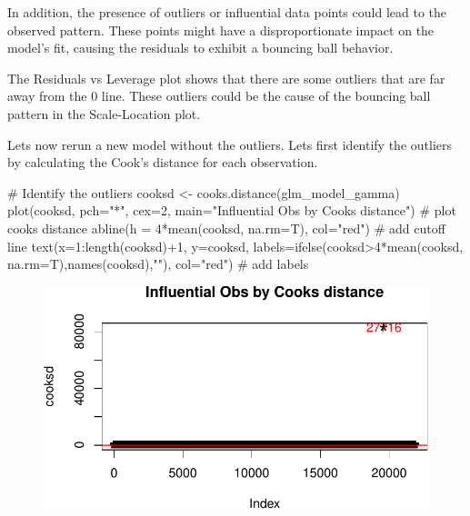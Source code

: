 \documentclass[
  super,
  preprint,
  3p]{elsarticle}
\newenvironment{Shaded}{\begin{snugshade}}{\end{snugshade}}
\newcommand{\AttributeTok}[1]{\textcolor[rgb]{0.40,0.45,0.13}{#1}}
\newcommand{\CommentTok}[1]{\textcolor[rgb]{0.37,0.37,0.37}{#1}}
\newcommand{\DecValTok}[1]{\textcolor[rgb]{0.68,0.00,0.00}{#1}}
\newcommand{\FunctionTok}[1]{\textcolor[rgb]{0.28,0.35,0.67}{#1}}
\newcommand{\NormalTok}[1]{\textcolor[rgb]{0.00,0.23,0.31}{#1}}
\newcommand{\OtherTok}[1]{\textcolor[rgb]{0.00,0.23,0.31}{#1}}
\newcommand{\SpecialCharTok}[1]{\textcolor[rgb]{0.37,0.37,0.37}{#1}}
\newcommand{\StringTok}[1]{\textcolor[rgb]{0.13,0.47,0.30}{#1}}
\begin{document}
In addition, the presence of outliers or influential data points could
lead to the observed pattern. These points might have a disproportionate
impact on the model's fit, causing the residuals to exhibit a bouncing
ball behavior.

The Residuals vs Leverage plot shows that there are some outliers that
are far away from the 0 line. These outliers could be the cause of the
bouncing ball pattern in the Scale-Location plot.

Lets now rerun a new model without the outliers. Lets first identify the
outliers by calculating the Cook's distance for each observation.

\begin{Shaded}
\begin{Highlighting}[]
\CommentTok{\# Identify the outliers}
\NormalTok{cooksd }\OtherTok{\textless{}{-}} \FunctionTok{cooks.distance}\NormalTok{(glm\_model\_gamma)}
\FunctionTok{plot}\NormalTok{(cooksd, }\AttributeTok{pch=}\StringTok{"*"}\NormalTok{, }\AttributeTok{cex=}\DecValTok{2}\NormalTok{, }\AttributeTok{main=}\StringTok{"Influential Obs by Cooks distance"}\NormalTok{)  }\CommentTok{\# plot cook\textquotesingle{}s distance}
\FunctionTok{abline}\NormalTok{(}\AttributeTok{h =} \DecValTok{4}\SpecialCharTok{*}\FunctionTok{mean}\NormalTok{(cooksd, }\AttributeTok{na.rm=}\NormalTok{T), }\AttributeTok{col=}\StringTok{"red"}\NormalTok{)  }\CommentTok{\# add cutoff line}
\FunctionTok{text}\NormalTok{(}\AttributeTok{x=}\DecValTok{1}\SpecialCharTok{:}\FunctionTok{length}\NormalTok{(cooksd)}\SpecialCharTok{+}\DecValTok{1}\NormalTok{, }\AttributeTok{y=}\NormalTok{cooksd, }\AttributeTok{labels=}\FunctionTok{ifelse}\NormalTok{(cooksd}\SpecialCharTok{\textgreater{}}\DecValTok{4}\SpecialCharTok{*}\FunctionTok{mean}\NormalTok{(cooksd, }\AttributeTok{na.rm=}\NormalTok{T),}\FunctionTok{names}\NormalTok{(cooksd),}\StringTok{""}\NormalTok{), }\AttributeTok{col=}\StringTok{"red"}\NormalTok{)  }\CommentTok{\# add labels}
\end{Highlighting}
\end{Shaded}

\begin{figure}[H]

{\centering \includegraphics{project_report_files/figure-pdf/unnamed-chunk-9-1.pdf}

}

\end{figure}
\end{document}
